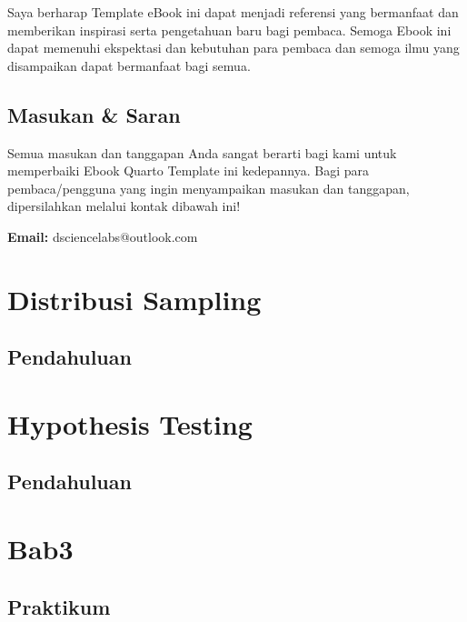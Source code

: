 \documentclass[
  letterpaper,
]{book}
\begin{document}
Saya berharap Template eBook ini dapat menjadi referensi yang bermanfaat
dan memberikan inspirasi serta pengetahuan baru bagi pembaca. Semoga
Ebook ini dapat memenuhi ekspektasi dan kebutuhan para pembaca dan
semoga ilmu yang disampaikan dapat bermanfaat bagi semua.

\section*{Masukan \& Saran}\label{masukan-saran}


Semua masukan dan tanggapan Anda sangat berarti bagi kami untuk
memperbaiki Ebook Quarto Template ini kedepannya. Bagi para
pembaca/pengguna yang ingin menyampaikan masukan dan tanggapan,
dipersilahkan melalui kontak dibawah ini!

\textbf{Email:} dsciencelabs@outlook.com


\chapter{Distribusi Sampling}\label{distribusi-sampling}

\section{Pendahuluan}\label{pendahuluan}


\chapter{Hypothesis Testing}\label{hypothesis-testing}

\section{Pendahuluan}\label{pendahuluan-1}


\chapter{Bab3}\label{bab3}

\section{Praktikum}\label{praktikum}
\end{document}
